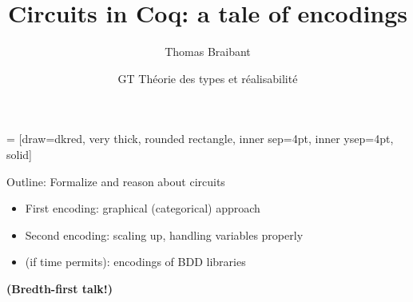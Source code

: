 \documentclass[9pt]{beamer}
\title{Circuits in Coq: a tale of encodings}%
\author{Thomas Braibant}
\institute[Inria]{Inria}
\date[11/2013]{GT Th\'eorie des types et r\'ealisabilit\'e}
\newcommand{\redemph}[1]{\alert{\emph{#1}}}
\begin{document}
\newcommand \orange[1]{{\color{orange}{#1}}}

\newcommand\parenthesis[1] {
  \begin{flushright}
    {\scriptsize \redemph{{{{ #1}}}}}
  \end{flushright}

}


\newcommand\plan[2]
{
\begin{frame}[plain]
  \begin{center}
    {\Huge  \sc #1} \\

    \vspace{1cm}

    #2
\end{center}
\end{frame}
}
\newcommand\eqdef{\triangleq}

 = [draw=dkred, very thick, rounded rectangle, inner
sep=4pt, inner ysep=4pt, solid]

\begin{frame}
  \center 
  \titlepage
\end{frame} 


\plan{Outline: Formalize and reason about circuits}{
  \begin{itemize}
  \item First encoding: graphical (categorical) approach
  \item Second encoding: scaling up, handling variables properly
  \item (if time permits): encodings of BDD libraries 
  \end{itemize}

  \pause

  \alert{\bf (Bredth-first talk!)}
}
\end{document}
